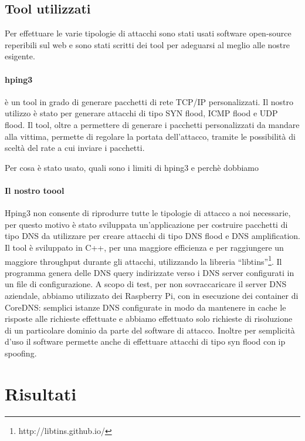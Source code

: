 \subsection{Tool utilizzati}

Per effettuare le varie tipologie di attacchi sono stati usati software open-source reperibili sul web e sono stati scritti dei tool per adeguarsi al meglio alle nostre esigente.

\paragraph{hping3} è un tool in grado di generare pacchetti di rete TCP/IP personalizzati. Il nostro utilizzo è stato per generare attacchi di tipo SYN flood, ICMP flood e UDP flood. Il tool, oltre a permettere di generare i pacchetti personalizzati da mandare alla vittima, permette di regolare la portata dell'attacco, tramite le possibilità di sceltà del rate a cui inviare i pacchetti.


Per cosa è stato usato, quali sono i limiti di hping3 e perchè dobbiamo

\paragraph{Il nostro toool}

Hping3 non consente di riprodurre tutte le tipologie di attacco a noi necessarie, per questo motivo è stato sviluppata un'applicazione per costruire pacchetti di tipo DNS da utilizzare per creare attacchi di tipo DNS flood e DNS amplification.
Il tool è sviluppato in C++, per una maggiore efficienza e per raggiungere un maggiore throughput durante gli attacchi, utilizzando la libreria ``libtins''\footnote{ http://libtins.github.io/}.
Il programma genera delle DNS query indirizzate verso i DNS server configurati in un file di configurazione. A scopo di test, per non sovraccaricare il server DNS aziendale, abbiamo utilizzato dei Raspberry Pi, con in esecuzione dei container di CoreDNS: semplici istanze DNS configurate in modo da mantenere in cache le risposte alle richieste effettuate e abbiamo effettuato solo richieste di risoluzione di un particolare dominio da parte del software di attacco.
Inoltre per semplicità d'uso il software permette anche di effettuare attacchi di tipo syn flood con ip spoofing.


\section{Risultati}

